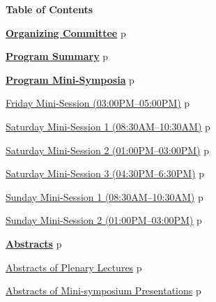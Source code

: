 \newpage\newpage
\thispagestyle{empty}
\newpage
\clearpage


\thispagestyle{empty}
\centerline{\bfseries\Large Table of Contents}
\vspace{4ex}

\noindent
\hyperref[committee]{{\bfseries\large  Organizing Committee}}%
\dotfill{}p\pageref{committee}
\vspace{3ex}

\noindent
\hyperref[programsummary]{{\bfseries\large  Program Summary}}%
\dotfill{}p\pageref{programsummary}
\vspace{3ex}

\noindent
\hyperref[program]{{\bfseries\large  Program Mini-Symposia}}%
\dotfill{}p\pageref{program}
\vspace{2ex}

\noindent\quad\hyperref[mini-friday]{{\large Friday Mini-Session (03:00PM--05:00PM)}}%
\dotfill{}p\pageref{mini-friday}
\vspace{2ex}

\noindent\quad\hyperref[mini-saturday1]{{\large Saturday Mini-Session 1 (08:30AM--10:30AM)}}%
\dotfill{}p\pageref{mini-saturday1}
\vspace{1ex}

\noindent\quad\hyperref[mini-saturday2]{{\large Saturday Mini-Session 2 (01:00PM--03:00PM)}}%
\dotfill{}p\pageref{mini-saturday2}
\vspace{1ex}

\noindent\quad\hyperref[mini-saturday3]{{\large Saturday Mini-Session 3 (04:30PM--6:30PM)}}%
\dotfill{}p\pageref{mini-saturday3}
\vspace{2ex}

\noindent\quad\hyperref[mini-sunday1]{{\large Sunday Mini-Session 1 (08:30AM--10:30AM)}}
\dotfill{}p\pageref{mini-sunday1}
\vspace{1ex}

\noindent\quad\hyperref[mini-sunday2]{{\large Sunday Mini-Session 2 (01:00PM--03:00PM)}}%
\dotfill{}p\pageref{mini-sunday2}
\vspace{3ex}

\noindent\hyperref[abstracts]{{\bfseries\large Abstracts}}%
\dotfill{}p\pageref{abstracts}
\vspace{2ex}

\noindent\quad\hyperref[plenary]{{\large  Abstracts of Plenary Lectures}}%
\dotfill{}p\pageref{plenary}
\vspace{1ex}

\noindent\quad\hyperref[absmini]{{\large  Abstracts of Mini-symposium Presentations}}%
\dotfill{}p\pageref{absmini}
\vspace{3ex}

